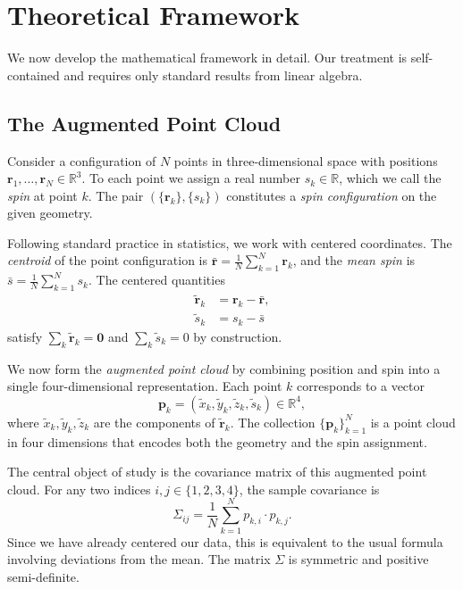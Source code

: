 \section{Theoretical Framework}
\label{sec:theory}

We now develop the mathematical framework in detail. Our treatment is self-contained and requires only standard results from linear algebra.

\subsection{The Augmented Point Cloud}
\label{sec:construction}

Consider a configuration of $N$ points in three-dimensional space with positions $\mathbf{r}_1, \ldots, \mathbf{r}_N \in \mathbb{R}^3$. To each point we assign a real number $s_k \in \mathbb{R}$, which we call the \emph{spin} at point $k$. The pair $(\{\mathbf{r}_k\}, \{s_k\})$ constitutes a \emph{spin configuration} on the given geometry.

Following standard practice in statistics, we work with centered coordinates. The \emph{centroid} of the point configuration is $\bar{\mathbf{r}} = \frac{1}{N} \sum_{k=1}^N \mathbf{r}_k$, and the \emph{mean spin} is $\bar{s} = \frac{1}{N} \sum_{k=1}^N s_k$. The centered quantities
\begin{align}
\tilde{\mathbf{r}}_k &= \mathbf{r}_k - \bar{\mathbf{r}}, \\
\tilde{s}_k &= s_k - \bar{s}
\end{align}
satisfy $\sum_k \tilde{\mathbf{r}}_k = \mathbf{0}$ and $\sum_k \tilde{s}_k = 0$ by construction.

We now form the \emph{augmented point cloud} by combining position and spin into a single four-dimensional representation. Each point $k$ corresponds to a vector
\[
\mathbf{p}_k = (\tilde{x}_k, \tilde{y}_k, \tilde{z}_k, \tilde{s}_k) \in \mathbb{R}^4,
\]
where $\tilde{x}_k, \tilde{y}_k, \tilde{z}_k$ are the components of $\tilde{\mathbf{r}}_k$. The collection $\{\mathbf{p}_k\}_{k=1}^N$ is a point cloud in four dimensions that encodes both the geometry and the spin assignment.

The central object of study is the covariance matrix of this augmented point cloud. For any two indices $i, j \in \{1, 2, 3, 4\}$, the sample covariance is
\[
\Sigma_{ij} = \frac{1}{N} \sum_{k=1}^N p_{k,i} \cdot p_{k,j}.
\]
Since we have already centered our data, this is equivalent to the usual formula involving deviations from the mean. The matrix $\Sigma$ is symmetric and positive semi-definite.

